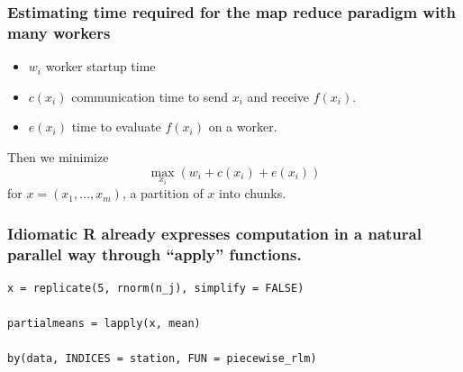 \documentclass{beamer}
\begin{document}
\begin{frame}

    \frametitle{Estimating time required for the map reduce paradigm with many workers}

\begin{itemize}
    \item $w_i$ worker startup time
    \item $c(x_i)$ communication time to send $x_i$ and receive $f(x_i)$.
    \item $e(x_i)$ time to evaluate $f(x_i)$ on a worker.
\end{itemize}

Then we minimize
\[
    \max_{x_i} \left( w_i + c(x_i) + e(x_i) \right)
\]
for $x = (x_1, \dots, x_m)$, a partition of $x$ into chunks.

%
%
%
%
%
\end{frame}
\begin{frame}[fragile]

    \frametitle{Idiomatic R already expresses computation in a natural
    parallel way through ``apply'' functions.}

\begin{verbatim}
x = replicate(5, rnorm(n_j), simplify = FALSE)

partialmeans = lapply(x, mean)

by(data, INDICES = station, FUN = piecewise_rlm)
\end{verbatim}


\end{frame}
\end{document}
